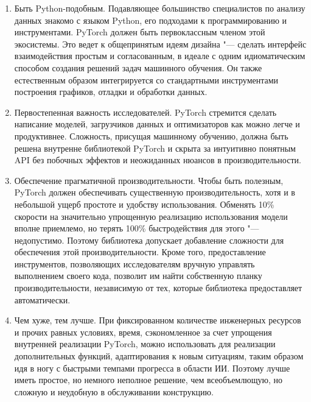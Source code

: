 \documentclass[bachelor, och, coursework]{SCWorks}
\begin{document}
        \begin{enumerate}
            \item
                Быть Python-подобным. Подавляющее большинство специалистов по
                анализу данных знакомо с языком Python, его подходами к
                программированию и инструментами. PyTorch должен быть
                первоклассным членом этой экосистемы. Это ведет к общепринятым
                идеям дизайна "--- сделать интерфейс взаимодействия простым и
                согласованным, в идеале с одним идиоматическим способом создания
                решений задач машинного обучения. Он также естественным образом
                интегрируется со стандартными инструментами построения графиков,
                отладки и обработки данных.
            \item
                Первостепенная важность исследователей. PyTorch стремится
                сделать написание моделей, загрузчиков данных и оптимизаторов
                как можно легче и продуктивнее. Сложность, присущая машинному
                обучению, должна быть решена внутренне библиотекой PyTorch и
                скрыта за интуитивно понятным API без побочных эффектов и
                неожиданных нюансов в производительности.
            \item
                Обеспечение прагматичной производительности. Чтобы быть
                полезным, PyTorch должен обеспечивать существенную
                производительность, хотя и в небольшой ущерб простоте и удобству
                использования. Обменять 10\% скорости на значительно упрощенную
                реализацию использования модели вполне приемлемо, но терять
                100\% быстродействия для этого "--- недопустимо. Поэтому
                библиотека допускает добавление сложности для обеспечения этой
                производительности. Кроме того, предоставление инструментов,
                позволяющих исследователям вручную управлять выполнением своего
                кода, позволит им найти собственную планку производительности,
                независимую от тех, которые библиотека предоставляет
                автоматически.
            \item
                Чем хуже, тем лучше. При фиксированном количестве инженерных
                ресурсов и прочих равных условиях, время, сэкономленное за счет
                упрощения внутренней реализации PyTorch, можно использовать для
                реализации дополнительных функций, адаптирования к новым
                ситуациям, таким образом идя в ногу с быстрыми темпами прогресса
                в области ИИ. Поэтому лучше иметь простое, но немного неполное
                решение, чем всеобъемлющую, но сложную и неудобную в
                обслуживании конструкцию.
        \end{enumerate}
        
\end{document}
